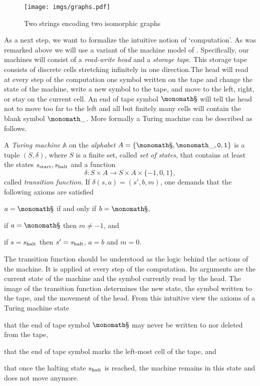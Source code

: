\begin{center}
  \begin{figure}
    \texttt{[image: imgs/graphs.pdf]}
    \caption{Two strings encoding two isomorphic graphs}
    \label{fig:encoding of graphs}
  \end{figure}
\end{center}

As a next step, we want to formalize the intuitive notion of ‘computation’. As
was remarked above we will use a variant of the machine model of
\textcite{Turing1936}. Specifically, our machines will consist of a
\emph{read-write head} and a \emph{storage tape}. This storage tape consists of
discrete cells stretching infinitely in one direction.The head will read at
every step of the computation one symbol written on the tape and change the
state of the machine, write a new symbol to the tape, and move to the left,
right, or stay on the current cell. An end of tape symbol \(\sta\) will tell the
head not to move too far to the left and all but finitely many cells will
contain the blank symbol \(\emp\). More formally a Turing machine can be
described as follows.

\begin{defin}
  A \emph{Turing machine} \(\mathbb A\) on the \emph{alphabet} \(A = \lbrace
  \sta, \emp, \zer, \one \rbrace\) is a tuple \((S, δ)\), where \(S\) is a
  finite set, called \emph{set of states}, that contains at least the states
  \(s_{\text{start}}, s_{\text{halt}}\) and a function
  \[
    δ: S × A → S × A × \lbrace -1, 0, 1 \rbrace,
  \]
  called \emph{transition function}. If \(δ(s, a) = (s', b, m)\), one
  demands that the following axioms are satisfied

  \begin{thmlist}
  \item
    \(a = \sta\) if and only if \(b = \sta\),
  \item
    if \(a = \sta\) then \(m ≠ -1\), and
  \item
    if \(s = s_{\text{halt}}\) then \(s' = s_{\text{halt}}\), \(a = b\) and \(m = 0\).
  \end{thmlist}
\end{defin}

The transition function should be understood as the logic behind the actions of
the machine. It is applied at every step of the computation. Its arguments are
the current state of the machine and the symbol currently read by the head. The
image of the transition function determines the new state, the symbol written to
the tape, and the movement of the head. From this intuitive view the axioms of a
Turing machine state
\begin{plist}
  \item that the end of tape symbol \(\sta\) may never be written to nor deleted
  from the tape,
  \item that the end of tape symbol marks the left-most cell of the tape, and
  \item that once the halting state \(s_{\text{halt}}\) is reached, the machine remains
  in this state and does not move anymore.
\end{plist}

